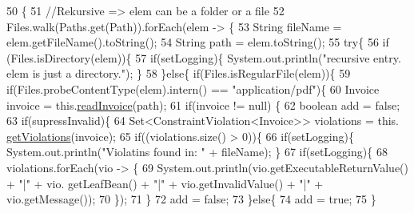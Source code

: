 \begin{DoxyCode}
50                                                                                                            
                                        \{
51         \textcolor{comment}{//Rekursive => elem can be a folder or a file }
52         Files.walk(Paths.get(Path)).forEach(elem -> \{
53             String fileName = elem.getFileName().toString();
54             String path = elem.toString();
55             \textcolor{keywordflow}{try}\{
56                 \textcolor{keywordflow}{if} (Files.isDirectory(elem))\{
57                     \textcolor{keywordflow}{if}(setLogging)\{ System.out.println(\textcolor{stringliteral}{"recursive entry. elem is just a directory."}); \}
58                 \}\textcolor{keywordflow}{else}\{  \textcolor{keywordflow}{if}(Files.isRegularFile(elem))\{
59                     \textcolor{keywordflow}{if}(Files.probeContentType(elem).intern() == \textcolor{stringliteral}{"application/pdf"})\{
60                         Invoice invoice = this.\hyperlink{class_import_1_1zugferd_handler_aea79c23595f003c943e908c95276ecf9}{readInvoice}(path);
61                         \textcolor{keywordflow}{if}(invoice != null) \{
62                             \textcolor{keywordtype}{boolean} add = \textcolor{keyword}{false};
63                             \textcolor{keywordflow}{if}(supressInvalid)\{
64                                 Set<ConstraintViolation<Invoice>> violations = this.
      \hyperlink{class_import_1_1zugferd_handler_acf26740b73f820812fadb01ccf712dd2}{getViolations}(invoice);
65                                 \textcolor{keywordflow}{if}((violations.size() > 0))\{
66                                     \textcolor{keywordflow}{if}(setLogging)\{ System.out.println(\textcolor{stringliteral}{"Violatins found in: "} + fileName); 
      \}
67                                     \textcolor{keywordflow}{if}(setLogging)\{ 
68                                         violations.forEach(vio -> \{
69                                             System.out.println(vio.getExecutableReturnValue() + \textcolor{stringliteral}{"|"} + vio.
      getLeafBean() + \textcolor{stringliteral}{"|"} + vio.getInvalidValue() + \textcolor{stringliteral}{"|"} + vio.getMessage());
70                                         \});
71                                     \}
72                                     add = \textcolor{keyword}{false};
73                                 \}\textcolor{keywordflow}{else}\{
74                                     add = \textcolor{keyword}{true};
75                                 \}

\end{DoxyCode}
